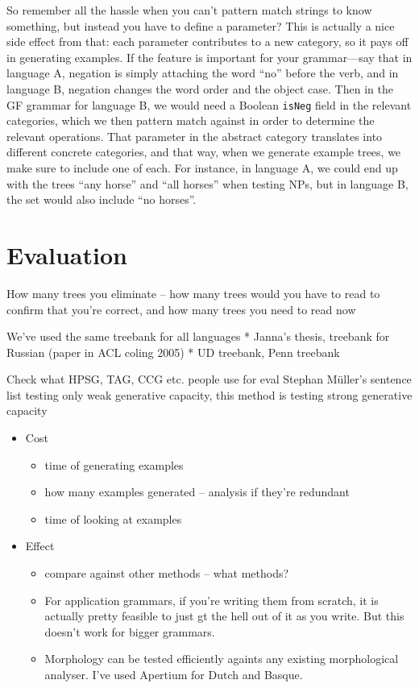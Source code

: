 \documentclass[11pt]{article}
\begin{document}
So remember all the hassle when you can't pattern match strings to
know something, but instead you have to define a parameter? This is
actually a nice side effect from that: each parameter contributes to a
new category, so it pays off in generating examples. If the feature is
important for your grammar---say that in language A, negation is
simply attaching the word  ``no'' before the verb, and in language B,
negation changes the word order and the object case. Then in the GF
grammar for language B, we would need a Boolean \texttt{isNeg} field
in the relevant categories, which we then pattern match against in
order to determine the relevant operations. That parameter in the
abstract category translates into different concrete categories, and
that way, when we generate example trees, we make sure to include one
of each. For instance, in language A, we could end up with the trees
``any horse'' and ``all horses'' when testing NPs, but in language B,
the set would also include ``no horses''. 



\section{Evaluation}

How many trees you eliminate -- how many trees would you have to read
to confirm that you're correct, and how many trees you need to read
now

We've used the same treebank for all languages
* Janna's thesis, treebank for Russian (paper in ACL coling 2005)
* UD treebank, Penn treebank

Check what HPSG, TAG, CCG etc. people use for eval
Stephan Müller's sentence list testing only weak generative capacity,
this method is testing strong generative capacity


\begin{itemize}
\item Cost
  \begin{itemize}
  \item time of generating examples
  \item how many examples generated -- analysis if they're redundant
  \item time of looking at examples
  \end{itemize}

\item Effect
  \begin{itemize}
  \item compare against other methods -- what methods?
  \item For application grammars, if you're writing them from scratch, it is actually pretty feasible to just gt the hell out of it as you write. But this doesn't work for bigger grammars.
  \item Morphology can be tested efficiently againts any existing morphological analyser. I've used Apertium for Dutch and Basque.
  \end{itemize}
\end{itemize}
\end{document}
